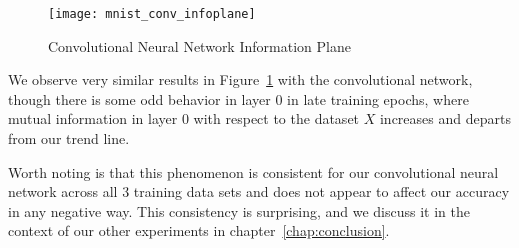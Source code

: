 \begin{figure}[h!]
\begin{center}
\texttt{[image: mnist\_conv\_infoplane]}
\caption{Convolutional Neural Network Information Plane}
\label{fig:mnist conv infoplane}
\centering
\end{center}
\end{figure}

We observe very similar results in Figure~\ref{fig:mnist conv infoplane} with the convolutional network, though there is some odd behavior in layer 0 in late training epochs, where mutual information in layer 0 with respect to the dataset $X$ increases and departs from our trend line.

Worth noting is that this phenomenon is consistent for our convolutional neural network across all 3 training data sets and does not appear to affect our accuracy in any negative way.
This consistency is surprising, and we discuss it in the context of our other experiments in chapter~\ref{chap:conclusion}.